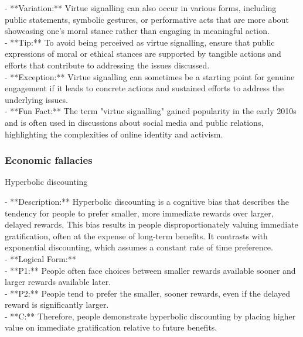 \documentclass[a4paper,12pt,single,pdftex]{scrartcl}
\begin{document}
    
      - **Variation:** Virtue signalling can also occur in various forms, including public statements, symbolic gestures, or performative acts that are more about showcasing one’s moral stance rather than engaging in meaningful action.
    \\

    
      - **Tip:** To avoid being perceived as virtue signalling, ensure that public expressions of moral or ethical stances are supported by tangible actions and efforts that contribute to addressing the issues discussed.
    \\

    
      - **Exception:** Virtue signalling can sometimes be a starting point for genuine engagement if it leads to concrete actions and sustained efforts to address the underlying issues.
    \\

    
      - **Fun Fact:** The term "virtue signalling" gained popularity in the early 2010s and is often used in discussions about social media and public relations, highlighting the complexities of online identity and activism.
    \\

  \subsubsection{Economic fallacies}


Hyperbolic discounting
    
      - **Description:** Hyperbolic discounting is a cognitive bias that describes the tendency for people to prefer smaller, more immediate rewards over larger, delayed rewards. This bias results in people disproportionately valuing immediate gratification, often at the expense of long-term benefits. It contrasts with exponential discounting, which assumes a constant rate of time preference.
    \\

    
      - **Logical Form:**
    \\

    
        - **P1:** People often face choices between smaller rewards available sooner and larger rewards available later.
    \\

    
        - **P2:** People tend to prefer the smaller, sooner rewards, even if the delayed reward is significantly larger.
    \\

    
        - **C:** Therefore, people demonstrate hyperbolic discounting by placing higher value on immediate gratification relative to future benefits.
    \\
\end{document}
